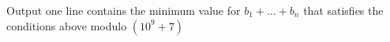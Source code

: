 Output one line contains the minimum value for $b_1 +\dots+ b_n$ that satisfies the conditions above modulo $(10^9+7)$